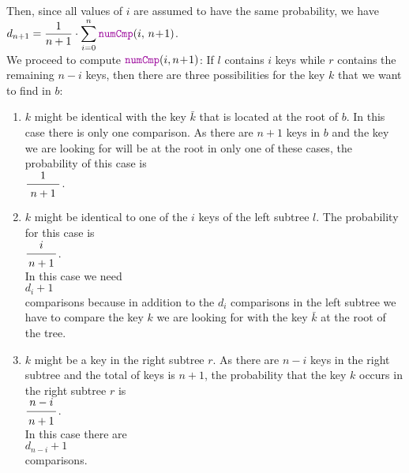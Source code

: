 \\[0.2cm]
Then, since all values of $i$ are assumed to have the same probability, we have
\\[0.2cm]
\hspace*{1.3cm}
$\ds d_{n+1} =  \frac{1}{n+1} \cdot \sum\limits_{i=0}^n \mytt{numCmp}(i,\, n\!+\!1)$.
\\[0.2cm]
We proceed to compute $\mytt{numCmp}(i,n\!+\!1)$:
If  $l$ contains $i$ keys while $r$ contains the remaining $n-i$ keys,
then there are three possibilities for the key $k$ that we want to find in $b$:
\begin{enumerate}
\item $k$ might be identical with the key $\bar{k}$ that is located at the root of $b$.
      In this case there is only one comparison.
      As there  are $n+1$ keys in $b$ and the key we are looking for will be at the root in only
      one of these cases, the probability of this case is
      \\[0.2cm]
      \hspace*{1.3cm} $\bruch{1}{\,n+1\,}$.

\item $k$ might be identical to one of the  $i$ keys of the left subtree $l$.
      The probability for this case is 
      \\[0.2cm]
      \hspace*{1.3cm} $\displaystyle\bruch{i}{n+1}$. \\[0.2cm]
      In this case we need 
      \\[0.2cm]
      \hspace*{1.3cm} $\displaystyle d_i + 1$ \\[0.2cm]
      comparisons because in addition to the  $d_i$ comparisons in the left subtree we have to
      compare the key $k$ we are looking for with the key $\bar{k}$ at the root of the tree.
\item $k$ might be a key in the right subtree $r$.  As there are  $n-i$ keys in the right subtree
      and the total of keys is $n+1$, the probability that the key  $k$ occurs in the right subtree $r$
      is \\[0.2cm]
      \hspace*{1.3cm} $\displaystyle \bruch{n-i}{n+1}$. \\[0.2cm]
      In this case there are  \\[0.2cm]
      \hspace*{1.3cm} $\displaystyle d_{n-i} + 1$ \\[0.2cm]
      comparisons. 
\end{enumerate}
